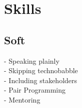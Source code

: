 \documentclass[]{resume}
\begin{document}
\begin{minipage}[t]{0.3\textwidth}
%
%


\section{Skills}

\subsection{Soft}
- Speaking plainly \\
- Skipping technobabble \\
- Including stakeholders \\
- Pair Programming \\
- Mentoring \\
\sectionsep


\end{minipage}
\end{document}
